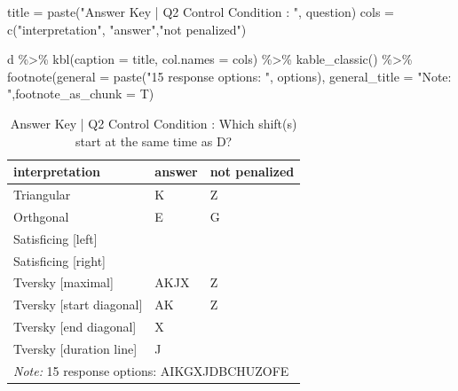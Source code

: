 \documentclass[
  letterpaper,
  DIV=11,
  numbers=noendperiod]{scrreprt}
\newenvironment{Shaded}{\begin{snugshade}}{\end{snugshade}}
\newcommand{\AttributeTok}[1]{\textcolor[rgb]{0.40,0.45,0.13}{#1}}
\newcommand{\FunctionTok}[1]{\textcolor[rgb]{0.28,0.35,0.67}{#1}}
\newcommand{\NormalTok}[1]{\textcolor[rgb]{0.00,0.23,0.31}{#1}}
\newcommand{\OtherTok}[1]{\textcolor[rgb]{0.00,0.23,0.31}{#1}}
\newcommand{\SpecialCharTok}[1]{\textcolor[rgb]{0.37,0.37,0.37}{#1}}
\newcommand{\StringTok}[1]{\textcolor[rgb]{0.13,0.47,0.30}{#1}}
\begin{document}
\begin{Shaded}
\begin{Highlighting}[]
\NormalTok{title }\OtherTok{=} \FunctionTok{paste}\NormalTok{(}\StringTok{"Answer Key | Q2 Control Condition : "}\NormalTok{, question)}
\NormalTok{cols }\OtherTok{=} \FunctionTok{c}\NormalTok{(}\StringTok{"interpretation"}\NormalTok{, }\StringTok{"answer"}\NormalTok{,}\StringTok{"not penalized"}\NormalTok{)}

\NormalTok{d }\SpecialCharTok{\%\textgreater{}\%} \FunctionTok{kbl}\NormalTok{(}\AttributeTok{caption =}\NormalTok{ title, }\AttributeTok{col.names =}\NormalTok{ cols) }\SpecialCharTok{\%\textgreater{}\%} \FunctionTok{kable\_classic}\NormalTok{() }\SpecialCharTok{\%\textgreater{}\%} 
  \FunctionTok{footnote}\NormalTok{(}\AttributeTok{general =} \FunctionTok{paste}\NormalTok{(}\StringTok{"15 response options: "}\NormalTok{, options), }\AttributeTok{general\_title =} \StringTok{"Note: "}\NormalTok{,}\AttributeTok{footnote\_as\_chunk =}\NormalTok{ T) }
\end{Highlighting}
\end{Shaded}

\begin{table}

\caption{Answer Key | Q2 Control Condition :  Which shift(s) start at the same time as D?}
\centering
\begin{tabular}[t]{l|l|l}
\hline
interpretation & answer & not penalized\\
\hline
Triangular & K & Z\\
\hline
Orthgonal & E & G\\
\hline
Satisficing [left] &  & \\
\hline
Satisficing [right] &  & \\
\hline
Tversky [maximal] & AKJX & Z\\
\hline
Tversky [start diagonal] & AK & Z\\
\hline
Tversky [end diagonal] & X & \\
\hline
Tversky [duration line] & J & \\
\hline
\multicolumn{3}{l}{\rule{0pt}{1em}\textit{Note: } 15 response options:  AIKGXJDBCHUZOFE}\\
\end{tabular}
\end{table}
\end{document}

